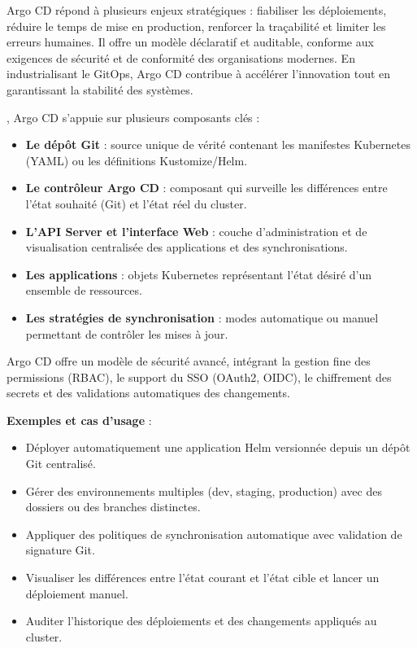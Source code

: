 Argo CD répond à plusieurs enjeux stratégiques  : fiabiliser les déploiements, réduire le temps de mise en production, renforcer la traçabilité et limiter les erreurs humaines. Il offre un modèle déclaratif et auditable, conforme aux exigences de sécurité et de conformité des organisations modernes. En industrialisant le GitOps, Argo CD contribue à accélérer l’innovation tout en garantissant la stabilité des systèmes.

, Argo CD s’appuie sur plusieurs composants clés  :
\begin{itemize}
	\item \textbf{Le dépôt Git}  : source unique de vérité contenant les manifestes Kubernetes (YAML) ou les définitions Kustomize/Helm.
	\item \textbf{Le contrôleur Argo CD}  : composant qui surveille les différences entre l’état souhaité (Git) et l’état réel du cluster.
	\item \textbf{L’API Server et l’interface Web}  : couche d’administration et de visualisation centralisée des applications et des synchronisations.
	\item \textbf{Les applications}  : objets Kubernetes représentant l’état désiré d’un ensemble de ressources.
	\item \textbf{Les stratégies de synchronisation}  : modes automatique ou manuel permettant de contrôler les mises à jour.
\end{itemize}

Argo CD offre un modèle de sécurité avancé, intégrant la gestion fine des permissions (RBAC), le support du SSO (OAuth2, OIDC), le chiffrement des secrets et des validations automatiques des changements.

\textbf{Exemples et cas d’usage} :
\begin{itemize}
	\item Déployer automatiquement une application Helm versionnée depuis un dépôt Git centralisé.
	\item Gérer des environnements multiples (dev, staging, production) avec des dossiers ou des branches distinctes.
	\item Appliquer des politiques de synchronisation automatique avec validation de signature Git.
	\item Visualiser les différences entre l’état courant et l’état cible et lancer un déploiement manuel.
	\item Auditer l’historique des déploiements et des changements appliqués au cluster.
\end{itemize}


